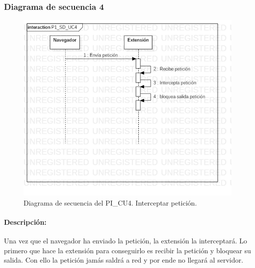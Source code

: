 \documentclass[12pt, a4paper, titlepage]{report}
\begin{document}
			    \subsubsection{Diagrama de secuencia 4}
			    \begin{figure}[H]
				    \begin{center} \includegraphics[width=15cm]{./imagenes/Desarrollo/Prototipo_1/P1_SD_UC4.png}
				    \caption[Diagrama de secuencia 4 del Prototipo I]{Diagrama de secuencia del PI\_CU4. Interceptar petición.}
			        \end{center}
			    \end{figure}
			    
			    \paragraph{Descripción:}
			    Una vez que el navegador ha enviado la petición, la extensión la interceptará. Lo primero que hace la extensión para conseguirlo es recibir la petición y bloquear su salida. Con ello la petición jamás saldrá a red y por ende no llegará al servidor.
			    
\end{document}
